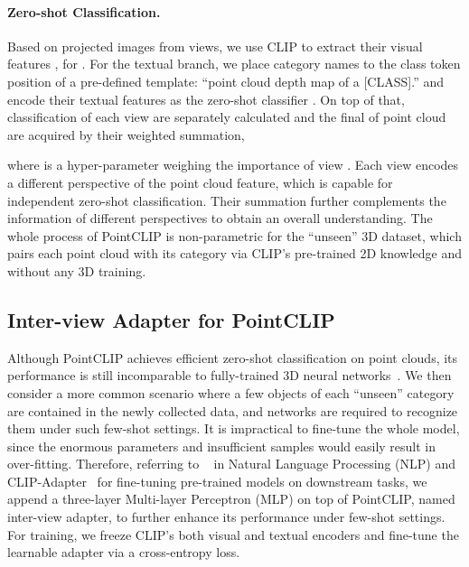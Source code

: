 \documentclass[10pt,twocolumn,letterpaper]{article}
\begin{document}
\vspace*{-12pt}
\paragraph{Zero-shot Classification.}
Based on projected images from  views, we use CLIP to extract their visual features , for . For the textual branch, we place  category names to the class token position of a pre-defined template: ``point cloud depth map of a [CLASS].'' and encode their textual features as the zero-shot classifier . On top of that, classification  of each view are separately calculated and the final  of point cloud are acquired by their weighted summation,

where  is a hyper-parameter weighing the importance of view . Each view  encodes a different perspective of the point cloud feature, which is capable for independent zero-shot classification. Their summation further complements the information of different perspectives to obtain an overall understanding. The whole process of PointCLIP is non-parametric for the ``unseen'' 3D dataset, which pairs each point cloud with its category via CLIP's pre-trained 2D knowledge and without any 3D training.


\vspace*{1pt}
\subsection{Inter-view Adapter for PointCLIP}
\label{inter-view}
Although PointCLIP achieves efficient zero-shot classification on point clouds, its performance is still incomparable to fully-trained 3D neural networks~\cite{qi2017pointnet,qi2017pointnet++}. We then consider a more common scenario where a few objects of each ``unseen'' category are contained in the newly collected data, and networks are required to recognize them under such few-shot settings. It is impractical to fine-tune the whole model, since the enormous parameters and insufficient samples would easily result in over-fitting. Therefore, referring to ~\cite{houlsby2019parameter} in Natural Language Processing (NLP) and CLIP-Adapter~\cite{gao2021clip} for fine-tuning pre-trained models on downstream tasks, we append a three-layer Multi-layer Perceptron (MLP) on top of PointCLIP, named inter-view adapter, to further enhance its performance under few-shot settings. For training, we freeze CLIP's both visual and textual encoders and fine-tune the learnable adapter via a cross-entropy loss.
\end{document}

